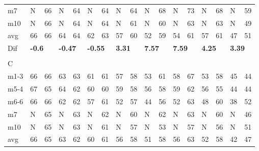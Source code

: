 \begin{table}[H]
\begin{tabular}{l|l|l|l|l|l|l|l|l|l|l|l|l|l|l|l|l}
m7   &    N  &      66   &   N  &   64     &   N        &     64      &    N    &     64       &      N      &       68     &      N      &       73     &        N   &       68     & N &  59\\
m10  &   N  &     66    &   N    &   64    &     N      &     64      &    N     &     61       &    N     &       60     &      N     &       63     &        N   &       63     & N & 49 \\ \hline
avg       &      66 &   66     &      64    &  64     &    62         &     63       &      57      &   60    &     52       &    59        &    54        &      61      &      57      &     61       & 47 &51 \\ \hline
Dif & \multicolumn{2}{l|}{\textbf{-0.6}} & \multicolumn{2}{l|}{\textbf{-0.47}} & \multicolumn{2}{l|}{\textbf{-0.55}} & \multicolumn{2}{l|}{\textbf{3.31}} & \multicolumn{2}{l|}{\textbf{7.57}} & \multicolumn{2}{l|}{\textbf{7.59}}& \multicolumn{2}{l|}{\textbf{4.25}}& \multicolumn{2}{l}{\textbf{3.39}} \\
\multicolumn{17}{l}{ } \\   
C & \multicolumn{2}{l|}{} & \multicolumn{2}{l|}{} & \multicolumn{2}{l|}{} & \multicolumn{2}{l|}{} & \multicolumn{2}{l|}{} & \multicolumn{2}{l|}{}& \multicolumn{2}{l|}{}& \multicolumn{2}{l}{}     \\ \hline
m1-3   &   66  &      66      &    63  &   63         &   61   &     61       &  57   &      58      &  53   &  61   &  58   &      67      &   53   &      58      & 45 &44  \\
m5-4   &    67  &      65      &   64  &     62       &   60    &     60       &  59  &      58      &  56  &  58   &   59  &        62    &   56  &      55      & 44 &44  \\
m6-6   &    66   &     66       &  62  &     62       &    57   &      61      &  52   &       57     &   44  & 56   &   52   &      63      &   48 &       60     & 38 & 52 \\
m7   &   N    &     65       &  N  &    63        & N   &      62      &  N   &      60      & N & 62   &   N   &      63      &   N   &    60        & N & 46 \\
m10  &  N   &      65      &   N  &    63        &  N  &      61      &   N  &       57    &  N  &  53 &  N   &     57       &   N  &      56      & N &  51\\ \hline
avg      &   66    &      65      &     63   &     62      &      60&   61      &       56  &     58       &   51   &  58     &  56     &   63         &      52      &    58        & 42 &47 \\ \hline

\end{tabular}
\end{table}
